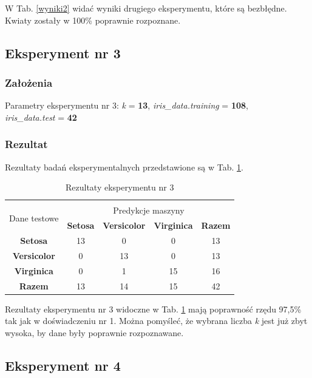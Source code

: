 \documentclass[12pt]{article}
\begin{document}
\noindent W Tab. \ref{wyniki2} widać wyniki drugiego eksperymentu, które są bezbłędne. Kwiaty zostały w 100\% poprawnie rozpoznane. \newline

\subsection{Eksperyment nr 3}
\subsubsection{Założenia}

Parametry eksperymentu nr 3: \textit{k} = \textbf{13}, \textit{iris\_data.training} = \textbf{108}, \\ \textit{iris\_data.test} = \textbf{42}

\subsubsection{Rezultat}

Rezultaty badań eksperymentalnych przedstawione są w Tab. \ref{wyniki3}.
\begin{table}[ht!]
 \centering
 \vspace{0.2cm}
  \begin{tabular}{|*{5}{c|}}
  \hline\\[-0.5cm]
   \multirow{2}{*}{Dane testowe} & \multicolumn{4}{c|}{Predykcje maszyny} \\ \cline{2-5}
   & \textbf{Setosa} & \textbf{Versicolor} & \textbf{Virginica} & \textbf{Razem}\\
  \hline
   \textbf{Setosa} & 13 & 0 & 0 & 13  \\ \hline
   \textbf{Versicolor} & 0 & 13 & 0 & 13  \\ \hline
   \textbf{Virginica} & 0 &  1 & 15 & 16  \\ \hline
   \textbf{Razem} & 13 & 14 & 15 & 42 \\
  \hline
 \end{tabular}
 \caption{Rezultaty eksperymentu nr 3}
 \label{wyniki3}
\end{table}

\noindent Rezultaty eksperymentu nr 3 widoczne w Tab. \ref{wyniki3} mają poprawność rzędu 97,5\% tak jak w doświadczeniu nr 1. Można pomyśleć, że wybrana liczba \textit{k} jest już zbyt wysoka, by dane były poprawnie rozpoznawane.\newline

\subsection{Eksperyment nr 4}
\end{document}
